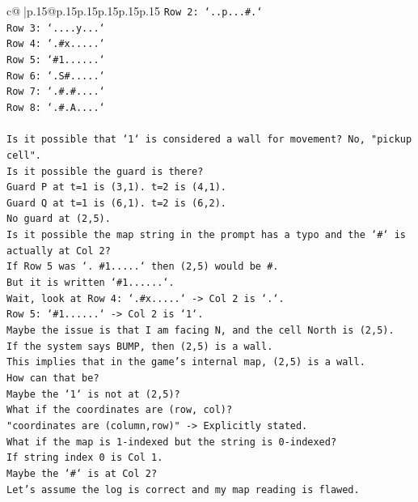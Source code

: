 \documentclass{article}
\begin{document}
{\begin{supertabular}{c@{$\;$}|p{.15\linewidth}@{}p{.15\linewidth}p{.15\linewidth}p{.15\linewidth}p{.15\linewidth}p{.15\linewidth}}
{{{\texttt{Row 2: `..p...\#.`} \\
\texttt{Row 3: `....y...`} \\
\texttt{Row 4: `.\#x.....`} \\
\texttt{Row 5: `\#1......`} \\
\texttt{Row 6: `.S\#.....`} \\
\texttt{Row 7: `.\#.\#....`} \\
\texttt{Row 8: `.\#.A....`} \\
\\ 
\texttt{Is it possible that `1` is considered a wall for movement? No, "pickup cell".} \\
\texttt{Is it possible the guard is there?} \\
\texttt{Guard P at t=1 is (3,1). t=2 is (4,1).} \\
\texttt{Guard Q at t=1 is (6,1). t=2 is (6,2).} \\
\texttt{No guard at (2,5).} \\
\texttt{Is it possible the map string in the prompt has a typo and the `\#` is actually at Col 2?} \\
\texttt{If Row 5 was `. \#1.....` then (2,5) would be \#.} \\
\texttt{But it is written `\#1......`.} \\
\texttt{Wait, look at Row 4: `.\#x.....` {-}> Col 2 is `.`.} \\
\texttt{Row 5: `\#1......` {-}> Col 2 is `1`.} \\
\texttt{Maybe the issue is that I am facing N, and the cell North is (2,5).} \\
\texttt{If the system says BUMP, then (2,5) is a wall.} \\
\texttt{This implies that in the game's internal map, (2,5) is a wall.} \\
\texttt{How can that be?} \\
\texttt{Maybe the `1` is not at (2,5)?} \\
\texttt{What if the coordinates are (row, col)?} \\
\texttt{"coordinates are (column,row)" {-}> Explicitly stated.} \\
\texttt{What if the map is 1{-}indexed but the string is 0{-}indexed?} \\
\texttt{If string index 0 is Col 1.} \\
\texttt{Maybe the `\#` is at Col 2?} \\
\texttt{Let's assume the log is correct and my map reading is flawed.} \\
}}}
\end{supertabular}}
\end{document}
